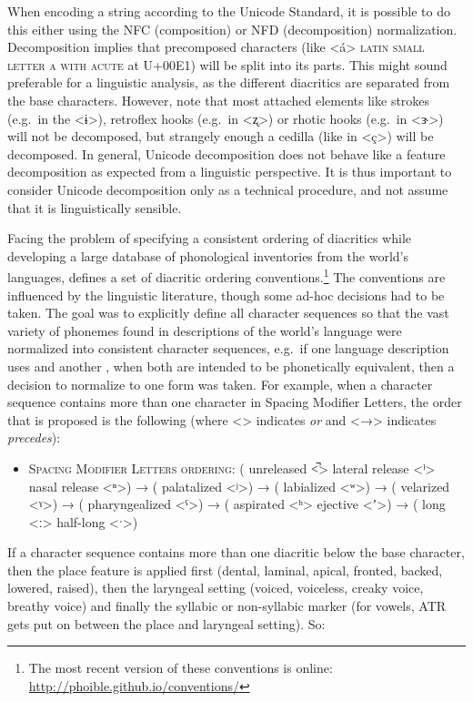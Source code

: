 When encoding a string according to the Unicode Standard, it is possible to do this either using the NFC (composition) or NFD (decomposition) normalization. Decomposition implies that precomposed characters (like <á> \textsc{latin small letter a with acute} at U+00E1) will be split into its parts. This might sound preferable for a linguistic analysis, as the different diacritics are separated from the base characters. However, note that most attached elements like strokes (e.g.~in the <ɨ>), retroflex hooks (e.g.~in <ʐ>) or rhotic hooks (e.g.~in <ɝ>) will not be decomposed, but strangely enough a cedilla (like in <ç>) will be decomposed. In general, Unicode decomposition does not behave like a feature decomposition as expected from a linguistic perspective. It is thus important to consider Unicode decomposition only as a technical procedure, and not assume that it is linguistically sensible.

Facing the problem of specifying a consistent ordering of diacritics while developing a large database of phonological inventories from the world's languages, \citet[540]{Moran2012} defines a set of diacritic ordering conventions.\footnote{The most recent version of these conventions is online: \url{http://phoible.github.io/conventions/}} The conventions are influenced by the linguistic literature, though some ad-hoc decisions had to be taken. The goal was to explicitly define all character sequences so that the vast variety of phonemes found in descriptions of the world's language were normalized into consistent character sequences, e.g.~if one language description uses and another , when both are intended to be phonetically equivalent, then a decision to normalize to one form was taken. For example, when a character sequence contains more than one character in Spacing Modifier Letters, the order that is proposed is the following (where <\textbar{}> indicates \textit{or} and <→> indicates \textit{precedes}):

\begin{itemize}
	\itemsep1pt\parskip0pt 
	\item \textsc{Spacing Modifier Letters ordering:} ( unreleased <̚> \textbar{} lateral release <ˡ> \textbar{} nasal release <ⁿ>) → ( palatalized <ʲ>) → ( labialized <ʷ>) → ( velarized <ˠ>) → ( pharyngealized <ˤ>) → ( aspirated <ʰ> \textbar{} ejective <ʼ>) → ( long <ː> \textbar{} half-long <ˑ>) 
\end{itemize}

If a character sequence contains more than one diacritic below the base character, then the place feature is applied first (dental, laminal, apical, fronted, backed, lowered, raised), then the laryngeal setting (voiced, voiceless, creaky voice, breathy voice) and finally the syllabic or non-syllabic marker (for vowels, ATR gets put on between the place and laryngeal setting). So:

